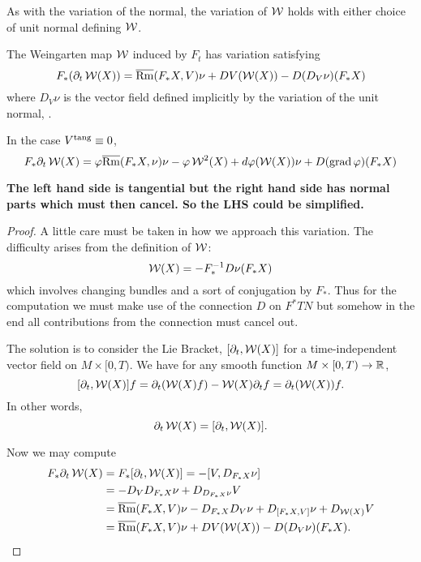 As with the variation of the normal, the variation of \(\operatorname{\mathcal{W}}\) holds with either choice of unit normal defining \(\operatorname{\mathcal{W}}\).

\begin{lemma}
\label{lem:dt_W}
The Weingarten map \(\operatorname{\mathcal{W}}\) induced by \(F_t\) has variation satisfying
\[
F_{\ast} (\partial_t \operatorname{\mathcal{W}} (X)) = \overline{\operatorname{Rm}} (F_{\ast} X, V)\nu + DV (\operatorname{\mathcal{W}} (X)) - D(D_V \nu) ({F_{\ast} X})
\]
where \(D_V \nu\) is the vector field defined implicitly by the variation of the unit normal, .

In the case \(V^{\operatorname{tang}} \equiv 0\),
\[
F_{\ast} \partial_t \operatorname{\mathcal{W}} (X) = \varphi \overline{\operatorname{Rm}} (F_{\ast} X, \nu) \nu - \varphi \operatorname{\mathcal{W}}^2(X) + d\varphi(\operatorname{\mathcal{W}} (X)) \nu + D(\operatorname{grad} \varphi) ({F_{\ast} X})
\]

\textbf{The left hand side is tangential but the right hand side has normal parts which must then cancel. So the LHS could be simplified.}
\end{lemma}

\begin{proof}
A little care must be taken in how we approach this variation. The difficulty arises from the definition of \(\operatorname{\mathcal{W}}\):
\[
\operatorname{\mathcal{W}}(X) = -F_{\ast}^{-1} D\nu(F_{\ast} X)
\]
which involves changing bundles and a sort of conjugation by \(F_{\ast}\). Thus for the computation we must make use of the connection \(D\) on \(F^{\ast} TN\) but somehow in the end all contributions from the connection must cancel out.

The solution is to consider the Lie Bracket, \([\partial_t, \operatorname{\mathcal{W}}(X)]\) for a time-independent vector field on \(M \times [0, T)\). We have for any smooth function \(M \times [0, T) \to \mathbb{R}\),
\[
[\partial_t, \operatorname{\mathcal{W}}(X)] f = \partial_t (\operatorname{\mathcal{W}}(X) f) - \operatorname{\mathcal{W}}(X) \partial_t f = \partial_t (\operatorname{\mathcal{W}}(X)) f.
\]
In other words,
\[
\partial_t \operatorname{\mathcal{W}}(X) = [\partial_t, \operatorname{\mathcal{W}}(X)].
\]

Now we may compute
\[
\begin{split}
F_{\ast} \partial_t \operatorname{\mathcal{W}}(X) &= F_{\ast} [\partial_t, \operatorname{\mathcal{W}}(X)] = -[V, D_{F_{\ast} X} \nu] \\
&= -D_V D_{F_{\ast} X} \nu + D_{D_{F_{\ast} X} \nu} V \\
&= \overline{\operatorname{Rm}} (F_{\ast} X, V)\nu - D_{F_{\ast} X} D_V \nu + D_{[F_{\ast} X, V]} \nu + D_{\operatorname{\mathcal{W}}(X)} V \\
&= \overline{\operatorname{Rm}} (F_{\ast} X, V)\nu + DV (\operatorname{\mathcal{W}} (X)) - D(D_V \nu) ({F_{\ast} X}).
\end{split}
\]
\end{proof}

